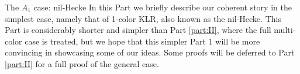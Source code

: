 \documentclass[11pt,reqno]{amsart}
\makeatletter
\def\part{\@startsection{part}{0}%
  \z@{\linespacing\@plus\linespacing}{.5\linespacing}%
  {\normalfont\large\scshape\centering}} %
\makeatother
\begin{document}



\part{The $A_1$ case: nil-Hecke}\label{part:I}
In this Part we briefly describe our coherent story in the simplest case, namely that of 1-color KLR, also known as the nil-Hecke. This Part is considerably shorter and simpler than Part \ref{part:II}, where the full multi-color case is treated, but we hope that this simpler Part 1 will be more convincing in showcasing some of our ideas. Some proofs will be deferred to Part \ref{part:II} for a full proof of the general case. 
\end{document}
